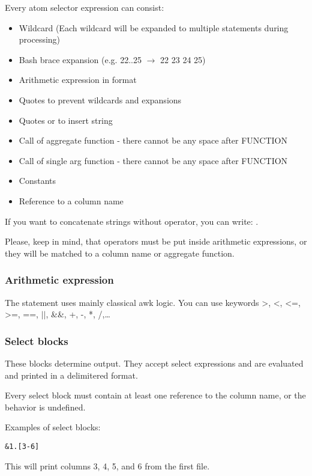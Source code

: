 Every atom selector expression can consist:
\begin{itemize}
    \item Wildcard (Each wildcard will be expanded to multiple statements during processing)
    \item Bash brace expansion (e.g. {22..25} $\rightarrow$ 22 23 24 25) \cite{bash-reference-manual}
    \item Arithmetic expression in  format
    \item Quotes  to prevent wildcards and expansions
    \item Quotes  or  to insert string
    \item Call of aggregate function  - there cannot be any space after FUNCTION
    \item Call of single arg function  - there cannot be any space after FUNCTION
    \item Constants
    \item Reference to a column name
\end{itemize}

If you want to concatenate strings without \icode{++} operator, you can write: .

Please, keep in mind, that operators must be put inside arithmetic expressions, or they will be matched to a column name or aggregate function.

\subsubsection{Arithmetic expression}
The statement uses mainly classical awk logic.\cite{awk-reference-manual} You can use keywords \textgreater, \textless, \textless=, \textgreater=, ==, $\vert\vert$, \&\&, +, -, *, /,\ldots

\subsubsection{Select blocks}
These blocks determine output. They accept select expressions and are evaluated and printed in a delimitered format.

Every select block must contain at least one reference to the column name, or the behavior is undefined.

Examples of select blocks:
\begin{verbatim}
&1.[3-6]
\end{verbatim}
This will print columns 3, 4, 5, and 6 from the first file.

